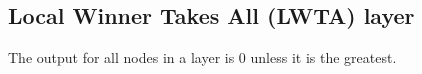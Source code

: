 
\subsection{Local Winner Takes All (LWTA) layer}

The output for all nodes in a layer is \(0\) unless it is the greatest.

